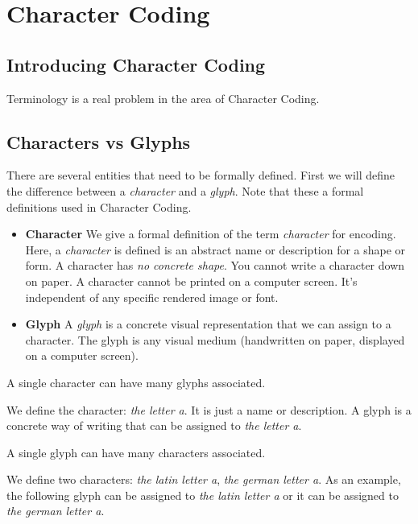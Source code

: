 
\chapter{Character Coding}


\section{Introducing Character Coding}


Terminology is a real problem in the area of Character Coding.


\section{Characters vs Glyphs}

There are several entities that need to be formally defined.
First we will define the difference between a \textit{character} and a \textit{glyph}.
Note that these a formal definitions used in Character Coding. 

\begin{itemize}   
\renewcommand{\labelitemi}{$\Box$}
\item \textbf{Character} We give a formal definition of the term \textit{character} for 
encoding. Here, a \textit{character} is defined is an abstract name or description for a shape or form. A character has \textit{no concrete shape}. You cannot write a character down on paper.
A character cannot be printed on a computer screen. It's independent of any specific rendered image or font.
\item \textbf{Glyph} A \textit{glyph} is a concrete visual representation that we can assign
to a character. The glyph is any visual medium (handwritten on paper, displayed on a computer screen).
\end{itemize}


A single character can have many glyphs associated.

\frmrule

\begin{example}
We define the character: \textit{the letter a}. 
It is just a name or description. A glyph is a concrete way of writing 
that can be assigned to \textit{the letter a}. 
\end{example}

A single glyph can have many characters associated. 

\frmrule


\begin{example}
We define two characters: \textit{the latin letter a}, \textit{the german letter a}. 
As an example, the following glyph can be assigned to \textit{the latin letter a}
or it can be assigned to \textit{the german letter a}. 
\end{example}

